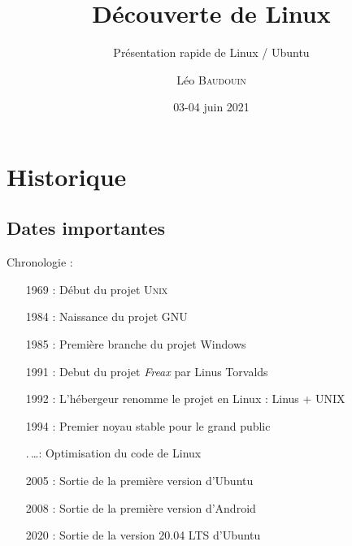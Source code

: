 \documentclass{beamer}
\title[Pr\'esentation Linux]{D\'ecouverte de Linux}
\subtitle{Présentation rapide de Linux / Ubuntu}
\author{L\'eo \textsc{Baudouin}}
\institute{
  {\url{baudouin.leo @ gmail.com}}
}
\date{03-04 juin 2021}
\begin{document}
\begin{frame}
\titlepage
\end{frame}

\begin{frame}
\tableofcontents
\end{frame}


\section{Historique}
\subsection{Dates importantes}
\begin{frame}
  \begin{block}{Chronologie :}
   ~~~~\begin{minipage}{\linewidth}
      \begin{itemize}
      \item[1969 :] Début du projet U\textsc{nix}
      \item[1984 :] Naissance du projet GNU
      \item[1985 :] Première branche du projet Windows
      \item[1991 :] Debut du projet \textit{Freax} par Linus Torvalds
      \item[1992 :] L'h\'ebergeur renomme le projet en Linux : Linus + UNIX
      \item[1994 :] Premier noyau stable pour le grand public
      \item[.\,\dots :] Optimisation du code de Linux
      \item[2005 :] Sortie de la première version d'Ubuntu
      \item[2008 :] Sortie de la première version d'Android
      \item[2020 :] Sortie de la version 20.04 LTS d'Ubuntu
      \end{itemize}
    \end{minipage}
  \end{block}
\end{frame}
\end{document}
